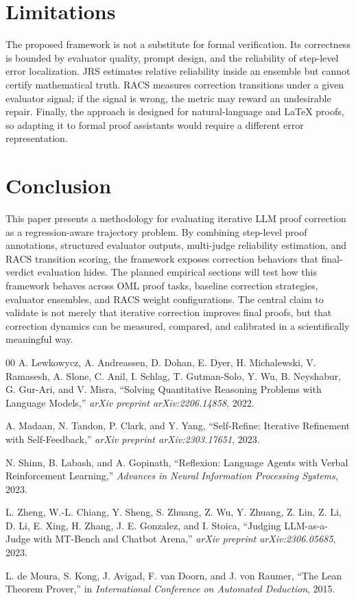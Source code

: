 \documentclass[conference]{IEEEtran}
\begin{document}
\section{Limitations}
The proposed framework is not a substitute for formal verification. Its correctness is bounded by evaluator quality, prompt design, and the reliability of step-level error localization. JRS estimates relative reliability inside an ensemble but cannot certify mathematical truth. RACS measures correction transitions under a given evaluator signal; if the signal is wrong, the metric may reward an undesirable repair. Finally, the approach is designed for natural-language and LaTeX proofs, so adapting it to formal proof assistants would require a different error representation.

\section{Conclusion}
This paper presents a methodology for evaluating iterative LLM proof correction as a regression-aware trajectory problem. By combining step-level proof annotations, structured evaluator outputs, multi-judge reliability estimation, and RACS transition scoring, the framework exposes correction behaviors that final-verdict evaluation hides. The planned empirical sections will test how this framework behaves across OML proof tasks, baseline correction strategies, evaluator ensembles, and RACS weight configurations. The central claim to validate is not merely that iterative correction improves final proofs, but that correction dynamics can be measured, compared, and calibrated in a scientifically meaningful way.

\begin{thebibliography}{00}
A. Lewkowycz, A. Andreassen, D. Dohan, E. Dyer, H. Michalewski, V. Ramasesh, A. Slone, C. Anil, I. Schlag, T. Gutman-Solo, Y. Wu, B. Neyshabur, G. Gur-Ari, and V. Misra, ``Solving Quantitative Reasoning Problems with Language Models,'' \emph{arXiv preprint arXiv:2206.14858}, 2022.

A. Madaan, N. Tandon, P. Clark, and Y. Yang, ``Self-Refine: Iterative Refinement with Self-Feedback,'' \emph{arXiv preprint arXiv:2303.17651}, 2023.

N. Shinn, B. Labash, and A. Gopinath, ``Reflexion: Language Agents with Verbal Reinforcement Learning,'' \emph{Advances in Neural Information Processing Systems}, 2023.

L. Zheng, W.-L. Chiang, Y. Sheng, S. Zhuang, Z. Wu, Y. Zhuang, Z. Lin, Z. Li, D. Li, E. Xing, H. Zhang, J. E. Gonzalez, and I. Stoica, ``Judging LLM-as-a-Judge with MT-Bench and Chatbot Arena,'' \emph{arXiv preprint arXiv:2306.05685}, 2023.

L. de Moura, S. Kong, J. Avigad, F. van Doorn, and J. von Raumer, ``The Lean Theorem Prover,'' in \emph{International Conference on Automated Deduction}, 2015.
\end{thebibliography}
\end{document}
